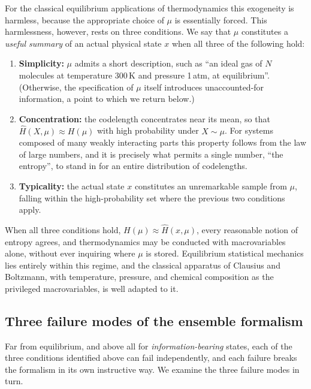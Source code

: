 \documentclass[11pt]{article}
\begin{document}
For the classical equilibrium applications of thermodynamics this exogeneity is harmless, because the appropriate choice of $\mu$ is essentially forced. This harmlessness, however, rests on three conditions. We say that $\mu$ constitutes a \emph{useful summary} of an actual physical state $x$ when all three of the following hold:
\begin{enumerate}[leftmargin=2em]
  \item \textbf{Simplicity:} $\mu$ admits a short description, such as ``an ideal gas of $N$ molecules at temperature 300\,K and pressure 1\,atm, at equilibrium''. (Otherwise, the specification of $\mu$ itself introduces unaccounted-for information, a point to which we return below.)
  \item \textbf{Concentration:} the codelength concentrates near its mean, so that $\hat H(X, \mu) \approx H(\mu)$ with high probability under $X \sim \mu$. For systems composed of many weakly interacting parts this property follows from the law of large numbers, and it is precisely what permits a single number, ``the entropy'', to stand in for an entire distribution of codelengths.
  \item \textbf{Typicality:} the actual state $x$ constitutes an unremarkable sample from $\mu$, falling within the high-probability set where the previous two conditions apply.
\end{enumerate}
When all three conditions hold, $H(\mu) \approx \hat H(x, \mu)$, every reasonable notion of entropy agrees, and thermodynamics may be conducted with macrovariables alone, without ever inquiring where $\mu$ is stored. Equilibrium statistical mechanics lies entirely within this regime, and the classical apparatus of Clausius and Boltzmann, with temperature, pressure, and chemical composition as the privileged macrovariables, is well adapted to it.

\subsection{Three failure modes of the ensemble formalism}
\label{sec:failures}

Far from equilibrium, and above all for \emph{information-bearing} states, each of the three conditions identified above can fail independently, and each failure breaks the formalism in its own instructive way. We examine the three failure modes in turn.
\end{document}
